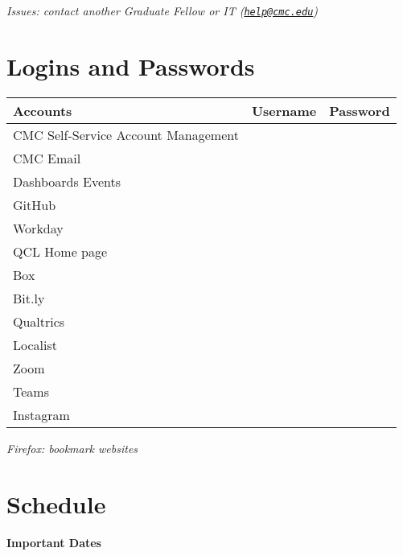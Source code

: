 \documentclass[
]{book}
\begin{document}
\emph{Issues: contact another Graduate Fellow or IT (\href{mailto:help@cmc.edu}{\nolinkurl{help@cmc.edu}})}

\hypertarget{logins-and-passwords}{%
\chapter{Logins and Passwords}\label{logins-and-passwords}}

\begin{longtable}[]{@{}lcr@{}}
\toprule
Accounts & Username & Password \\
\midrule
\endhead
CMC Self-Service Account Management & & \\
CMC Email & & \\
Dashboards Events & & \\
GitHub & & \\
Workday & & \\
QCL Home page & & \\
Box & & \\
Bit.ly & & \\
Qualtrics & & \\
Localist & & \\
Zoom & & \\
Teams & & \\
Instagram & & \\
\bottomrule
\end{longtable}

\emph{Firefox: bookmark websites}

\hypertarget{schedule}{%
\chapter{Schedule}\label{schedule}}

\textbf{Important Dates}
\end{document}

